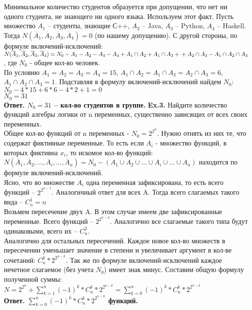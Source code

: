 \documentclass[a4paper,12pt]{article}
\begin{document}
Минимальное количество студентов образуется при допущении, что нет ни одного студента, не знающего ни одного языка. Используем этот факт. Пусть множество $A_1$ -- студенты, знающие С++, $A_2$ -- Java, $A_3$ -- Python, $A_4$ -- Haskell. Тогда $N(\overline A_1, \overline A_2, \overline A_3, \overline A_4  ) = 0$ (по нашему допущению). С другой стороны, по формуле включений-исключений:
\\
 $N(\overline A_1, \overline A_2, \overline A_3, \overline A_4  ) = N_0 - A_1 - A_2 - A_3 - A_4 + A_1 \cap A_2 + A_1 \cap A_3 +
\\
+ A_2 \cap A_3 - A_1 \cap A_2 \cap A_3 $, где $N_0$ - общее кол-во человек.
\\
По условию $A_1 = A_2 = A_3 = A_4 = 15$, $  A_1 \cap A_2 = A_1 \cap A_3 = A_2 \cap A_3 = 6 $, $ A_1 \cap A_2 \cap A_3 = 1 $. Подставляя в формулу включений-исключений найдем $N_0$:
\\
$N_0 - 4*15 + 6*6 - 4*2 + 1 = 0$
\\
$N_0 = 31$
\\
\textbf{Ответ. $ N_0 = 31 $ -- кол-во студентов в группе.}
\newpage
\textbf{Ex.3.} Найдите количество функций алгебры логики от n переменных, существенно зависящих от всех своих переменных.
\\

Общее кол-во функций от n переменных - $N_0 = 2^{2^n}$. Нужно отнять из них те, что содержат фиктивные переменные. То есть если $A_i$ - множество функций, в которых фиктивна $x_i$, то искомое кол-во функций:
\\
 $ N(\overline A_1, \overline A_2, ... , \overline A_i, ... , \overline A_n) = N_0 - (A_1 \cup A_2 \cup ... \cup A_i \cup ... \cup A_n)$ находится по формуле включений-исключений.
\\
Ясно, что во множестве $A_i$ одна переменная зафиксирована, то есть всего функций -- $ 2^{2^{n-1}} $. Аналогичный ответ для всех A. Тогда всего слагаемых такого вида -- $ C_n^1 = n $
\\
Возьмем пересечение двух A. В этом случае имеем две зафиксированные переменные. Всего функций -- $2^{2^{n-2}}$. Аналогично все слагаемые такого типа будут одинаковыми, всего их -- $ C_n^2 $.
\\
Аналогично для остальных пересечений. Каждое новое кол-во множеств в пересечении уменьшает значение в степени и увеличивает аргумент в кол-ве сочетаний: $ C_n^k * 2^{2^{n-k}} $. Так же по формуле включений-исключений каждое нечетное слагаемое (без учета $N_0$) имеет знак минус. Составим общую формулу полученной суммы:
\\
$N = 2^{2^{n}} + \sum\limits_{k=1}^n (-1)^{k} * C_n^k * 2^{2^{n-k}} = \sum\limits_{k=0}^n (-1)^{k} * C_n^k * 2^{2^{n-k}}$
\\  
\textbf{Ответ. $ \sum\limits_{k=0}^n (-1)^{k} * C_n^k * 2^{2^{n-k}} $ функций.}
\\
\end{document}
